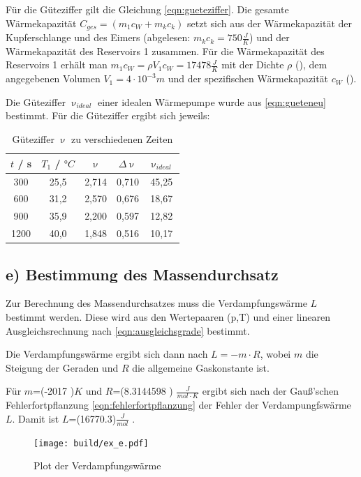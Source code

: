 Für die Güteziffer gilt die Gleichung \eqref{eqn:gueteziffer}.
Die gesamte Wärmekapazität $C_{ges} = (m_1 c_W + m_k c_k)$ setzt sich aus der Wärmekapazität der Kupferschlange und des Eimers (abgelesen: $m_k c_k = 750 \frac{J}{K}$) und der Wärmekapazität des Reservoirs 1 zusammen.
Für die Wärmekapazität des Reservoirs 1 erhält man $m_1 c_W = \rho V_1 c_W = 17478 \frac{J}{K}$ mit der Dichte $\rho$ (\cite{geschke}), dem angegebenen Volumen $V_1 = 4 \cdot 10^{-3} m$ und der spezifischen Wärmekapazität $c_W$ (\cite{geschke}).

Die Güteziffer $\upnu_{ideal}$ einer idealen Wärmepumpe wurde aus \eqref{eqn:gueteneu} bestimmt.
Für die Güteziffer ergibt sich jeweils:
\begin{table}
	\centering
	\caption{Güteziffer $\upnu$ zu verschiedenen Zeiten}
	\label{tab:gueteziffer}
\begin{tabular}{ccccc}
	\toprule
	$t$ / s & $T_1$ / $°C$ & $\upnu$ & $\Delta \upnu$ & $\upnu_{ideal}$ \\
	\midrule
	300 & 25,5 & 2,714 & 0,710 & 45,25 \\
	600 & 31,2 & 2,570 & 0,676 & 18,67 \\
	900 & 35,9 & 2,200 & 0,597 & 12,82 \\
	1200 & 40,0 & 1,848 & 0,516 & 10,17 \\
	\bottomrule
\end{tabular}
\end{table}


\subsection{e) Bestimmung des Massendurchsatz}
\label{sec:Massendurchsatz}
Zur Berechnung des Massendurchsatzes muss die Verdampfungswärme $L$ bestimmt werden.
Diese wird aus den Wertepaaren (p,T) und einer linearen Ausgleichsrechnung nach \eqref{eqn:ausgleichsgrade} bestimmt.

Die Verdampfungswärme ergibt sich dann nach $ L = −m \cdot R$, wobei $m$ die Steigung der Geraden und $R$ die allgemeine Gaskonstante ist.

Für $m$=(-2017 )$K$ und $R$=(8.3144598 ) $\frac{J}{mol\cdot K}$ \cite{gas}
ergibt sich nach der Gauß’schen Fehlerfortpflanzung \eqref{eqn:fehlerfortpflanzung} der Fehler der Verdampungfswärme $L$.
Damit ist $L$=(16770.3)$\frac{J}{mol}$ .


\begin{figure}
  \centering
  \texttt{[image: build/ex\_e.pdf]}
  \caption{Plot der Verdampfungswärme}
  \label{fig:verdampfungswaerme}
\end{figure}



